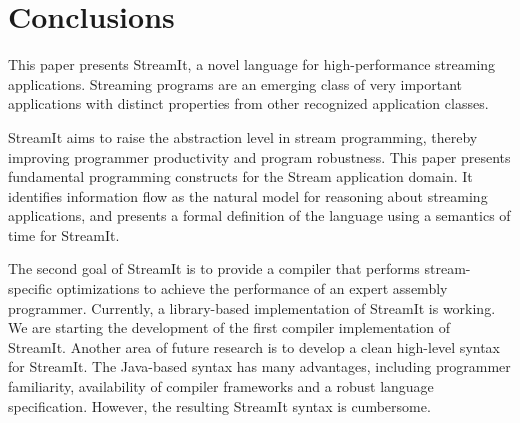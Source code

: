 \section{Conclusions}
\label{sec:conc}

This paper presents StreamIt, a novel language for high-performance
streaming applications.  Streaming programs are an emerging class of
very important applications with distinct properties from other
recognized application classes.

StreamIt aims to raise the abstraction level in stream programming,
thereby improving programmer productivity and program robustness. This
paper presents fundamental programming constructs for the Stream
application domain. It identifies information flow as the natural
model for reasoning about streaming applications, and presents a
formal definition of the language using a semantics of time for
StreamIt.

The second goal of StreamIt is to provide a compiler that performs
stream-specific optimizations to achieve the performance of an expert
assembly programmer. Currently, a library-based implementation of
StreamIt is working. We are starting the development of the first
compiler implementation of StreamIt. Another area of future research
is to develop a clean high-level syntax for StreamIt. The Java-based
syntax has many advantages, including programmer familiarity,
availability of compiler frameworks and a robust language
specification. However, the resulting StreamIt syntax is cumbersome.




